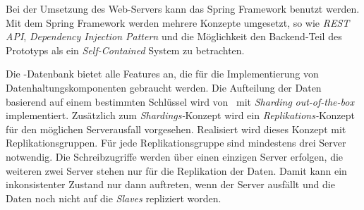 Bei der Umsetzung des Web-Servers kann das Spring Framework benutzt werden. Mit dem Spring Framework werden mehrere Konzepte umgesetzt, so wie \textit{REST API}, \textit{Dependency Injection Pattern} und die Möglichkeit den Backend-Teil des Prototyps als ein \textit{Self-Contained} System zu betrachten.

Die \mongo-Datenbank bietet alle Features an, die für die Implementierung von Datenhaltungskomponenten gebraucht werden. Die Aufteilung der Daten basierend auf einem bestimmten Schlüssel wird von \mongo\ mit \textit{Sharding} \textit{out-of-the-box} implementiert. Zusätzlich zum \textit{Shardings-}Konzept wird ein \textit{Replikations-}Konzept für den möglichen Serverausfall vorgesehen. Realisiert wird dieses Konzept mit Replikationsgruppen. Für jede Replikationsgruppe sind mindestens drei Server notwendig. Die Schreibzugriffe werden über einen einzigen Server erfolgen, die weiteren zwei Server stehen nur für die Replikation der Daten. Damit kann ein inkonsistenter Zustand nur dann auftreten, wenn der Server ausfällt und die Daten noch nicht auf die \textit{Slaves} repliziert worden.
